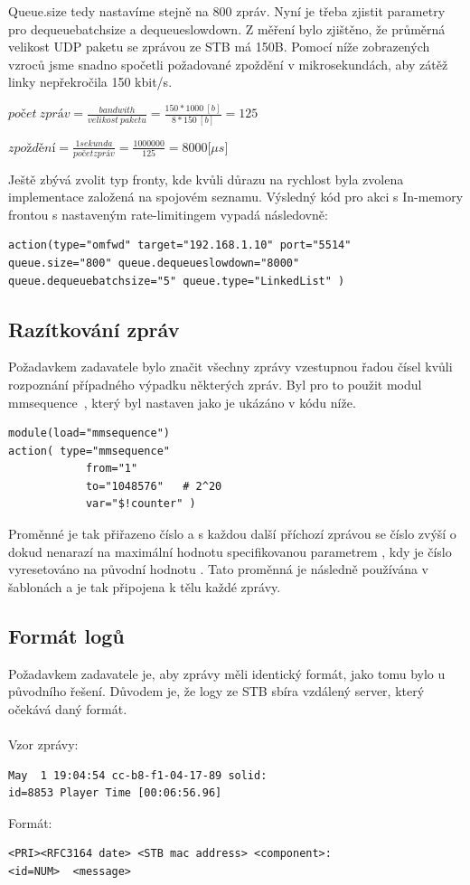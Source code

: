 \documentclass[thesis=B,czech]{FITthesis}[2012/06/26]
\begin{document}
Queue.size tedy nastavíme stejně na 800 zpráv. Nyní je třeba zjistit parametry pro dequeuebatchsize a dequeueslowdown. Z měření bylo zjištěno, že průměrná velikost UDP paketu se zprávou ze STB má 150B. Pomocí níže zobrazených vzroců jsme snadno spočetli požadované zpoždění v mikrosekundách, aby zátěž linky nepřekročila 150 kbit/s.
\begin{description}
  \item $počet~zpráv=\frac{bandwith}{velikost~paketu}=\frac{150*1000~[b]}{8*150~[b]}=125$
  \item $zpoždění=\frac{1 sekunda}{počet zpráv}=\frac{1 000 000}{125}= 8000 [\mu$$s]$
\end{description}
Ještě zbývá zvolit typ fronty, kde kvůli důrazu na rychlost byla zvolena implementace založená na spojovém seznamu.
Výsledný kód pro akci s In-memory frontou s nastaveným rate-limitingem vypadá následovně:
\begin{lstlisting}
action(type="omfwd" target="192.168.1.10" port="5514"
queue.size="800" queue.dequeueslowdown="8000"
queue.dequeuebatchsize="5" queue.type="LinkedList" )
\end{lstlisting}


\subsection{Razítkování zpráv}
Požadavkem zadavatele bylo značit všechny zprávy vzestupnou řadou čísel kvůli rozpoznání případného výpadku některých zpráv.
Byl pro to použit modul mmsequence~\cite{RsyslogMmsequence}, který byl nastaven jako je ukázáno v kódu níže.
\begin{lstlisting}
module(load="mmsequence")
action(	type="mmsequence"
            from="1"
            to="1048576"   # 2^20
            var="$!counter" )
\end{lstlisting}
Proměnné  je tak přiřazeno číslo  a s každou další příchozí zprávou se číslo zvýší o  dokud nenarazí na maximální hodnotu specifikovanou parametrem , kdy je číslo vyresetováno na původní hodnotu .
Tato proměnná je následně používána v šablonách a je tak připojena k tělu každé zprávy.

\subsection{Formát logů}
Požadavkem zadavatele je, aby zprávy měli identický formát, jako tomu bylo u původního řešení. Důvodem je, že logy ze STB sbíra vzdálený server, který očekává daný formát.
\\
\\
Vzor zprávy:
\begin{lstlisting}
May  1 19:04:54 cc-b8-f1-04-17-89 solid:
id=8853 Player Time [00:06:56.96]
\end{lstlisting}
Formát:
\begin{lstlisting}
<PRI><RFC3164 date> <STB mac address> <component>:
<id=NUM>  <message>
\end{lstlisting}
\end{document}
